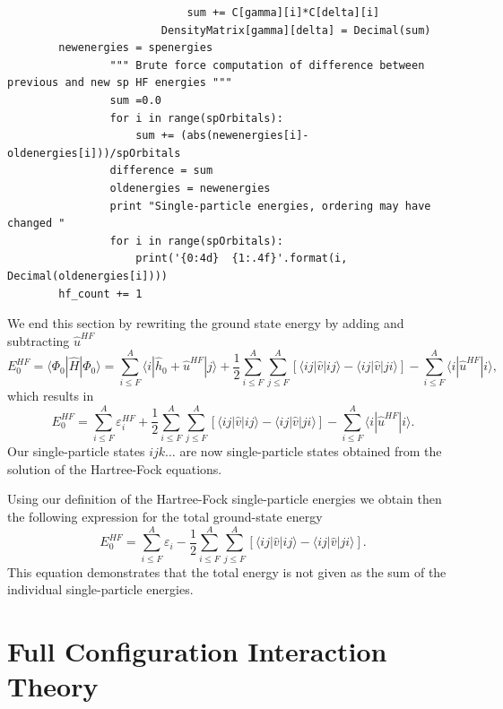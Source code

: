 \begin{lstlisting}
                            sum += C[gamma][i]*C[delta][i]
                        DensityMatrix[gamma][delta] = Decimal(sum)
		newenergies = spenergies
                """ Brute force computation of difference between previous and new sp HF energies """
                sum =0.0
                for i in range(spOrbitals):
                    sum += (abs(newenergies[i]-oldenergies[i]))/spOrbitals
                difference = sum
                oldenergies = newenergies
                print "Single-particle energies, ordering may have changed "
                for i in range(spOrbitals):
                    print('{0:4d}  {1:.4f}'.format(i, Decimal(oldenergies[i])))
		hf_count += 1
\end{lstlisting}





  We end this section by rewriting the ground state energy by adding
  and subtracting $\hat{u}^{HF}$
  \[
    E_0^{HF} =\langle \Phi_0 | \hat{H} | \Phi_0\rangle = \sum_{i\le
      F}^A \langle i | \hat{h}_0 +\hat{u}^{HF}| j\rangle+
    \frac{1}{2}\sum_{i\le F}^A\sum_{j \le F}^A\left[\langle ij
      |\hat{v}|ij \rangle-\langle
      ij|\hat{v}|ji\rangle\right]-\sum_{i\le F}^A \langle i
    |\hat{u}^{HF}| i\rangle,
  \]
  which results in
  \[
    E_0^{HF} = \sum_{i\le F}^A \varepsilon_i^{HF} +
    \frac{1}{2}\sum_{i\le F}^A\sum_{j \le F}^A\left[\langle ij
      |\hat{v}|ij \rangle-\langle
      ij|\hat{v}|ji\rangle\right]-\sum_{i\le F}^A \langle i
    |\hat{u}^{HF}| i\rangle.
  \]
  Our single-particle states $ijk\dots$ are now single-particle states
  obtained from the solution of the Hartree-Fock equations.



  Using our definition of the Hartree-Fock single-particle energies we
  obtain then the following expression for the total ground-state
  energy
  \[
    E_0^{HF} = \sum_{i\le F}^A \varepsilon_i - \frac{1}{2}\sum_{i\le
      F}^A\sum_{j \le F}^A\left[\langle ij |\hat{v}|ij \rangle-\langle
      ij|\hat{v}|ji\rangle\right].
  \]
  This equation demonstrates that the total energy is not given as the
  sum of the individual single-particle energies.

  \section{Full Configuration Interaction Theory}\label{sec:fci}

